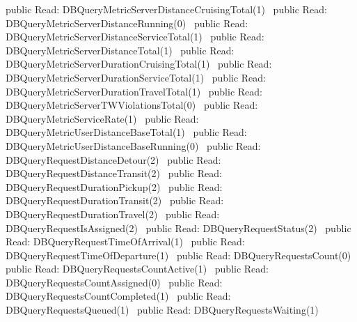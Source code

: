 public \LA{}Read: DBQueryMetricServerDistanceCruisingTotal(1)~{\nwtagstyle{}}\RA{}
public \LA{}Read: DBQueryMetricServerDistanceRunning(0)~{\nwtagstyle{}}\RA{}
public \LA{}Read: DBQueryMetricServerDistanceServiceTotal(1)~{\nwtagstyle{}}\RA{}
public \LA{}Read: DBQueryMetricServerDistanceTotal(1)~{\nwtagstyle{}}\RA{}
public \LA{}Read: DBQueryMetricServerDurationCruisingTotal(1)~{\nwtagstyle{}}\RA{}
public \LA{}Read: DBQueryMetricServerDurationServiceTotal(1)~{\nwtagstyle{}}\RA{}
public \LA{}Read: DBQueryMetricServerDurationTravelTotal(1)~{\nwtagstyle{}}\RA{}
public \LA{}Read: DBQueryMetricServerTWViolationsTotal(0)~{\nwtagstyle{}}\RA{}
public \LA{}Read: DBQueryMetricServiceRate(1)~{\nwtagstyle{}}\RA{}
public \LA{}Read: DBQueryMetricUserDistanceBaseTotal(1)~{\nwtagstyle{}}\RA{}
public \LA{}Read: DBQueryMetricUserDistanceBaseRunning(0)~{\nwtagstyle{}}\RA{}
public \LA{}Read: DBQueryRequestDistanceDetour(2)~{\nwtagstyle{}}\RA{}
public \LA{}Read: DBQueryRequestDistanceTransit(2)~{\nwtagstyle{}}\RA{}
public \LA{}Read: DBQueryRequestDurationPickup(2)~{\nwtagstyle{}}\RA{}
public \LA{}Read: DBQueryRequestDurationTransit(2)~{\nwtagstyle{}}\RA{}
public \LA{}Read: DBQueryRequestDurationTravel(2)~{\nwtagstyle{}}\RA{}
public \LA{}Read: DBQueryRequestIsAssigned(2)~{\nwtagstyle{}}\RA{}
public \LA{}Read: DBQueryRequestStatus(2)~{\nwtagstyle{}}\RA{}
public \LA{}Read: DBQueryRequestTimeOfArrival(1)~{\nwtagstyle{}}\RA{}
public \LA{}Read: DBQueryRequestTimeOfDeparture(1)~{\nwtagstyle{}}\RA{}
public \LA{}Read: DBQueryRequestsCount(0)~{\nwtagstyle{}}\RA{}
public \LA{}Read: DBQueryRequestsCountActive(1)~{\nwtagstyle{}}\RA{}
public \LA{}Read: DBQueryRequestsCountAssigned(0)~{\nwtagstyle{}}\RA{}
public \LA{}Read: DBQueryRequestsCountCompleted(1)~{\nwtagstyle{}}\RA{}
public \LA{}Read: DBQueryRequestsQueued(1)~{\nwtagstyle{}}\RA{}
public \LA{}Read: DBQueryRequestsWaiting(1)~{\nwtagstyle{}}\RA{}

